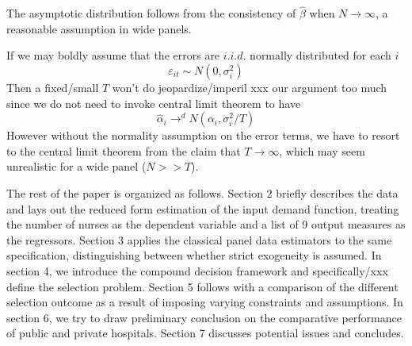 \documentclass[12pt]{article}
\begin{document}
The asymptotic distribution follows from the consistency of $\hat{\beta}$ when
$N \to \infty$, a reasonable assumption in wide panels.

If we may boldly assume that the errors are $i.i.d.$ normally distributed for
each $i$
\begin{equation*}
    \varepsilon_{it} \sim N(0, \sigma_i^2)
\end{equation*}
Then a fixed/small $T$ won't do jeopardize/imperil xxx our argument too much since we do not need to invoke central
limit theorem to have
\begin{equation*}
    \hat{\alpha}_i\to^d N(\alpha_i,\sigma_i^2/T)
\end{equation*}
However without the normality assumption on the error terms, we have to resort to the
central limit theorem from the claim that $T\to \infty$, which may seem unrealistic for a wide panel ($N>>T$).

The rest of the paper is organized as follows. Section 2 briefly describes the
data and lays out the reduced form estimation of the input demand function,
treating the number of nurses as the dependent variable and a list of 9 output
measures as the regressors. Section 3 applies the classical panel data
estimators to the same specification, distinguishing between whether strict
exogeneity is assumed. In section 4, we introduce the compound decision
framework and specifically/xxx define the selection problem. Section 5 follows
with a comparison of the different selection outcome as a result of imposing
varying constraints and assumptions. In section 6, we try to draw preliminary
conclusion on the comparative performance of public and private hospitals.
Section 7 discusses potential issues and concludes.

\newpage

\end{document}
